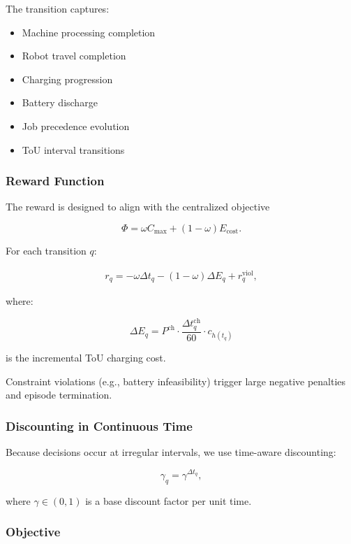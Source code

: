 \documentclass[preprint, 3p, review, 12pt]{elsarticle}
\begin{document}
The transition captures:
\begin{itemize}
    \item Machine processing completion
    \item Robot travel completion
    \item Charging progression
    \item Battery discharge
    \item Job precedence evolution
    \item ToU interval transitions
\end{itemize}

\subsubsection{Reward Function}

The reward is designed to align with the centralized objective

\[
\Phi = \omega C_{\max} + (1-\omega)E_{\text{cost}}.
\]

For each transition $q$:

\begin{align}
r_q
=
-\omega \Delta t_q
-(1-\omega)\Delta E_q
+ r_q^{\mathrm{viol}},
\end{align}

where:

\[
\Delta E_q
=
P^{\mathrm{ch}}
\cdot
\frac{\Delta t_q^{\mathrm{ch}}}{60}
\cdot
c_{h(t_q)}
\]

is the incremental ToU charging cost.

Constraint violations (e.g., battery infeasibility) trigger
large negative penalties and episode termination.

\subsubsection{Discounting in Continuous Time}

Because decisions occur at irregular intervals,
we use time-aware discounting:

\[
\gamma_q = \gamma^{\Delta t_q},
\]

where $\gamma \in (0,1)$ is a base discount factor per unit time.

\subsubsection{Objective}
\end{document}
